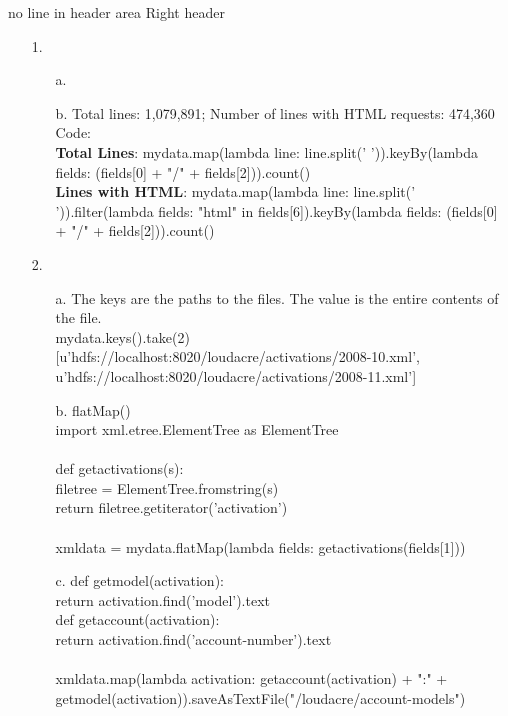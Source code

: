 \documentclass{article}
\begin{document}
\pagestyle{fancy}
\renewcommand{\labelitemiii}{$\bullet$}
\renewcommand{\headrulewidth}{0pt}  no line in header area
 Right header


\begin{itemize}

\item[1.] 
	\begin{itemize}
		\item[a.]
		\item[b.] Total lines: 1,079,891; Number of lines with HTML requests: 474,360\\
		Code: \\
		\textbf{Total Lines}: mydata.map(lambda line: line.split(' ')).keyBy(lambda fields: (fields{[0]} + "/" + fields{[2]})).count()\\
		\textbf{Lines with HTML}: mydata.map(lambda line: line.split(' ')).filter(lambda fields: "html" in fields[6]).keyBy(lambda fields: (fields[0] + "/" + fields[2])).count()
	\end{itemize}

\pagebreak
\setlength{\headsep}{5pt}
\item[2.]
	\begin{itemize}
		\item[a.] The keys are the paths to the files. The value is the entire contents of the file.\\
				mydata.keys().take(2)\\
				{[u'hdfs://localhost:8020/loudacre/activations/2008-10.xml',\\
 				u'hdfs://localhost:8020/loudacre/activations/2008-11.xml']}
		\item[b.] flatMap()\\
				import xml.etree.ElementTree as ElementTree\\
				\\
				def getactivations(s):\\
    				filetree = ElementTree.fromstring(s)\\
    				return filetree.getiterator('activation')\\
				\\
				xmldata = mydata.flatMap(lambda fields: getactivations(fields[1]))\\
		\item[c.]
				def getmodel(activation):\\
 					return activation.find('model').text\\
				def getaccount(activation):\\
      				return activation.find('account-number').text\\
      				\\
				xmldata.map(lambda activation: getaccount(activation) + ":" + getmodel(activation)).saveAsTextFile("/loudacre/account-models")


\end{itemize}
\end{itemize}
\end{document}
